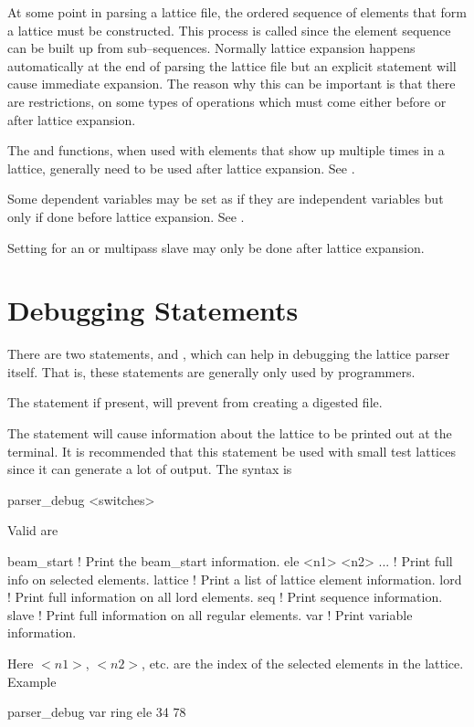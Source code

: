 At some point in parsing a lattice file, the ordered sequence of
elements that form a lattice must be constructed. This process is
called  since the element sequence can be built
up from sub--sequences. Normally lattice expansion happens
automatically at the end of parsing the lattice file but an explicit
 statement will cause immediate expansion. The
reason why this can be important is that there are restrictions, on
some types of operations which must come either before or after
lattice expansion. 
\begin{Itemize}
\item 
{}
The  and  functions, when used with elements
that show up multiple times in a lattice, generally need to be used
after lattice expansion. See .
\item 
Some dependent variables may be set as if they are independent
variables but only if done before lattice expansion. See
.
\item 
Setting  for an  or  multipass
slave may only be done after lattice expansion.
\end{Itemize}

\section{Debugging Statements}

There are two statements,  and ,
which can help in debugging the \bmad lattice parser
itself.  That is, these statements are generally only used by programmers.

The  statement if present, will prevent \bmad from 
creating a digested file. 

The  statement will cause information about the
lattice to be printed out at the terminal. It is recommended that this
statement be used with small test lattices since it can generate a lot
of output. The syntax is
\begin{example}
  parser_debug <switches>
\end{example}
Valid  are
\begin{example}
  beam_start          ! Print the beam_start information.
  ele <n1> <n2> ...   ! Print full info on selected elements.
  lattice             ! Print a list of lattice element information.
  lord                ! Print full information on all lord elements.
  seq                 ! Print sequence information.
  slave               ! Print full information on all regular elements.
  var                 ! Print variable information.
\end{example}
Here $<n1>$, $<n2>$, etc. are the index of the selected elements in
the lattice.  Example
\begin{example}
  parser\_debug var ring ele 34 78
\end{example}




